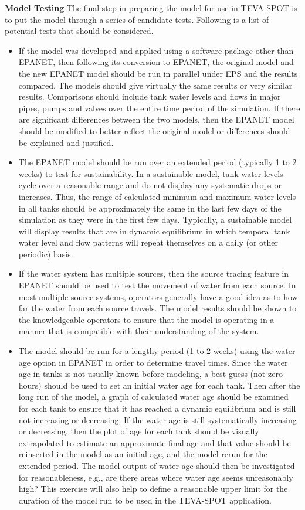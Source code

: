 {\bf Model Testing}
The final step in preparing the model for use in TEVA-SPOT is to put the model through a series of candidate tests. Following is a list of potential tests that should be considered.
\begin{itemize} 
\item If the model was developed and applied using a software package other than EPANET, then following its conversion to EPANET, the original model and the new EPANET model should be run in parallel under EPS and the results compared. The models should give virtually the same results or very similar results. Comparisons should include tank water levels and flows in major pipes, pumps and valves over the entire time period of the simulation. If there are significant differences between the two models, then the EPANET model should be modified to better reflect the original model or differences should be explained and justified.
\item The EPANET model should be run over an extended period (typically 1 to 2 weeks) to test for sustainability. In a sustainable model, tank water levels cycle over a reasonable range and do not display any systematic drops or increases. Thus, the range of calculated minimum and maximum water levels in all tanks should be approximately the same in the last few days of the simulation as they were in the first few days. Typically, a sustainable model will display results that are in dynamic equilibrium in which temporal tank water level and flow patterns will repeat themselves on a daily (or other periodic) basis.
\item If the water system has multiple sources, then the source tracing feature in EPANET should be used to test the movement of water from each source. In most multiple source systems, operators generally have a good idea as to how far the water from each source travels. The model results should be shown to the knowledgeable operators to ensure that the model is operating in a manner that is compatible with their understanding of the system.
\item The model should be run for a lengthy period (1 to 2 weeks) using the water age option in EPANET in order to determine travel times. Since the water age in tanks is not usually known before modeling, a best guess (not zero hours) should be used to set an initial water age for each tank.  Then after the long run of the model, a graph of calculated water age should be examined for each tank to ensure that it has reached a dynamic equilibrium and is still not increasing or decreasing. If the water age is still systematically increasing or decreasing, then the plot of age for each tank should be visually extrapolated to estimate an approximate final age and that value should be reinserted in the model as an initial age, and the model rerun for the extended period. The model output of water age should then be investigated for reasonableness, e.g., are there areas where water age seems unreasonably high? This exercise will also help to define a reasonable upper limit for the duration of the model run to be used in the TEVA-SPOT application.
\end{itemize}

